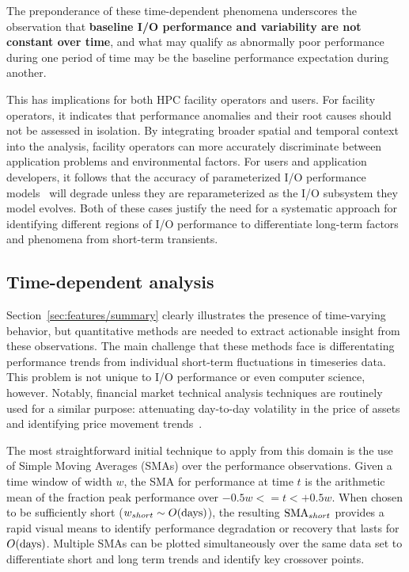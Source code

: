 The preponderance of these time-dependent phenomena underscores the observation that \textbf{baseline I/O performance and variability are not constant over time}, and
what may qualify as abnormally poor performance during one period of time may be the baseline performance expectation during another.

This has implications for both HPC facility operators and users.  For
facility operators, it indicates that performance anomalies and their root
causes should not be assessed in isolation. By integrating broader spatial and
temporal context into the analysis, facility operators can more accurately
discriminate between application problems and environmental factors.
For users and application developers, it follows that the accuracy of parameterized I/O performance models~\cite{Xie2012,Madireddy2017} will degrade unless they are reparameterized as the I/O subsystem they model evolves.
Both of these cases justify the need for a systematic approach for identifying different regions of I/O performance to differentiate long-term factors and phenomena from short-term transients.

\subsection{Time-dependent analysis} \label{sec:features/timedependent}

Section~\ref{sec:features/summary} clearly illustrates the presence of
time-varying behavior, but quantitative methods are needed to extract 
actionable insight from these observations.  The main challenge that these
methods face is differentating performance trends from individual short-term
fluctuations in timeseries data.
This problem is not unique to I/O performance or even computer science,
however.  Notably, financial market technical analysis techniques are
routinely used for a similar purpose: attenuating day-to-day volatility in
the price of assets and identifying price movement
trends~\cite{james1968monthly,gunasekarage2001profitability}.  

The most straightforward initial technique to apply from this domain is
the use of Simple Moving Averages (SMAs) over the performance observations.
Given a time window of width $w$, the SMA for performance at time $t$ is the arithmetic mean of the fraction peak performance over ${-0.5w <= t < +0.5w}$.
When chosen to be sufficiently short (${w_{short} \sim O(\textup{days})}$),
the resulting $\textup{SMA}_{short}$ provides a rapid visual means to
identify performance degradation or recovery that lasts for
$O(\textup{days})$.  Multiple SMAs can be plotted simultaneously over the
same data set to differentiate short and long term trends and identify key
crossover points. 

